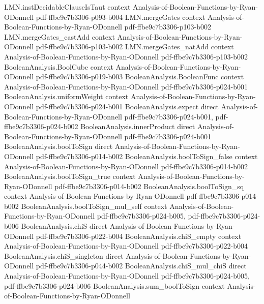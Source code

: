 \begin{lemma}
  {LMN.instDecidableClauseIsTaut}
  {context}
  {Analysis-of-Boolean-Functions-by-Ryan-ODonnell}
  {pdf-ffbe9c7b3306-p093-b004}
\proofstep
  {LMN.mergeGates}
  {context}
  {Analysis-of-Boolean-Functions-by-Ryan-ODonnell}
  {pdf-ffbe9c7b3306-p103-b002}
\proofstep
  {LMN.mergeGates_castAdd}
  {context}
  {Analysis-of-Boolean-Functions-by-Ryan-ODonnell}
  {pdf-ffbe9c7b3306-p103-b002}
\proofstep
  {LMN.mergeGates_natAdd}
  {context}
  {Analysis-of-Boolean-Functions-by-Ryan-ODonnell}
  {pdf-ffbe9c7b3306-p103-b002}
\proofstep
  {BooleanAnalysis.BoolCube}
  {context}
  {Analysis-of-Boolean-Functions-by-Ryan-ODonnell}
  {pdf-ffbe9c7b3306-p019-b003}
\proofstep
  {BooleanAnalysis.BooleanFunc}
  {context}
  {Analysis-of-Boolean-Functions-by-Ryan-ODonnell}
  {pdf-ffbe9c7b3306-p024-b001}
\proofstep
  {BooleanAnalysis.uniformWeight}
  {context}
  {Analysis-of-Boolean-Functions-by-Ryan-ODonnell}
  {pdf-ffbe9c7b3306-p024-b001}
\proofstep
  {BooleanAnalysis.expect}
  {direct}
  {Analysis-of-Boolean-Functions-by-Ryan-ODonnell}
  {pdf-ffbe9c7b3306-p024-b001,
    pdf-ffbe9c7b3306-p024-b002}
\proofstep
  {BooleanAnalysis.innerProduct}
  {direct}
  {Analysis-of-Boolean-Functions-by-Ryan-ODonnell}
  {pdf-ffbe9c7b3306-p024-b001}
\proofstep
  {BooleanAnalysis.boolToSign}
  {direct}
  {Analysis-of-Boolean-Functions-by-Ryan-ODonnell}
  {pdf-ffbe9c7b3306-p014-b002}
\proofstep
  {BooleanAnalysis.boolToSign_false}
  {context}
  {Analysis-of-Boolean-Functions-by-Ryan-ODonnell}
  {pdf-ffbe9c7b3306-p014-b002}
\proofstep
  {BooleanAnalysis.boolToSign_true}
  {context}
  {Analysis-of-Boolean-Functions-by-Ryan-ODonnell}
  {pdf-ffbe9c7b3306-p014-b002}
\proofstep
  {BooleanAnalysis.boolToSign_sq}
  {context}
  {Analysis-of-Boolean-Functions-by-Ryan-ODonnell}
  {pdf-ffbe9c7b3306-p014-b002}
\proofstep
  {BooleanAnalysis.boolToSign_mul_self}
  {context}
  {Analysis-of-Boolean-Functions-by-Ryan-ODonnell}
  {pdf-ffbe9c7b3306-p024-b005,
    pdf-ffbe9c7b3306-p024-b006}
\proofstep
  {BooleanAnalysis.chiS}
  {direct}
  {Analysis-of-Boolean-Functions-by-Ryan-ODonnell}
  {pdf-ffbe9c7b3306-p022-b004}
\proofstep
  {BooleanAnalysis.chiS_empty}
  {context}
  {Analysis-of-Boolean-Functions-by-Ryan-ODonnell}
  {pdf-ffbe9c7b3306-p022-b004}
\proofstep
  {BooleanAnalysis.chiS_singleton}
  {direct}
  {Analysis-of-Boolean-Functions-by-Ryan-ODonnell}
  {pdf-ffbe9c7b3306-p044-b002}
\proofstep
  {BooleanAnalysis.chiS_mul_chiS}
  {direct}
  {Analysis-of-Boolean-Functions-by-Ryan-ODonnell}
  {pdf-ffbe9c7b3306-p024-b005,
    pdf-ffbe9c7b3306-p024-b006}
\proofstep
  {BooleanAnalysis.sum_boolToSign}
  {context}
  {Analysis-of-Boolean-Functions-by-Ryan-ODonnell}

\end{lemma}
